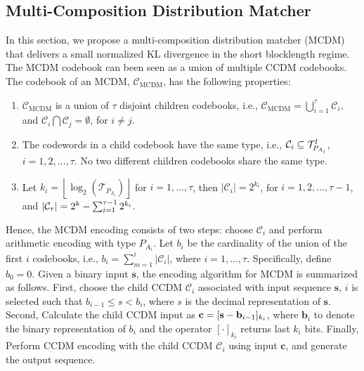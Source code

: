 \documentclass [PhD] {uclathes}
\begin{document}
\subsection{Multi-Composition Distribution Matcher }
In this section, we propose a multi-composition distribution matcher (MCDM) that delivers a small normalized KL divergence in the short blocklength regime. The MCDM codebook can been seen as a union of multiple CCDM codebooks. 
%
The codebook of an MCDM, $\mathcal{C}_{\mathrm{MCDM}}$, has the following properties: 
\begin{enumerate}
    \item $\mathcal{C}_{\mathrm{MCDM}}$ is a union of $\tau$ disjoint children codebooks, i.e., $\mathcal{C}_{\mathrm{MCDM}}=\bigcup_{i=1}^{\tau} \mathcal{C}_i,$ and $\mathcal{C}_i\bigcap \mathcal{C}_j = \emptyset$, for $i\neq j$.
     \item The codewords in a child codebook have the same type, i.e., $\mathcal{C}_{i}\subseteq \mathcal{T}^{l}_{P_{A_i}}$, $ i = 1,2,\ldots,\tau$. No two different children codebooks share the same type. 
    \item Let $k_i=\left\lfloor\log_2(\mathcal{T}_{P_{A_i}})\right\rfloor$ for $i=1,\ldots,\tau$, then $\left|\mathcal{C}_i\right|=2^{k_i}$, for $ i=1,2,\ldots,\tau-1$, and  $|\mathcal{C}_\tau|=2^k-\sum_{i=1}^{\tau-1}2^{k_i}$.
\end{enumerate}

Hence, the MCDM encoding consists of two steps: choose $\mathcal{C}_i$ and perform arithmetic encoding with type $P_{A_i}$.
Let $b_i$ be the cardinality of the union of the first $i$ codebooks, i.e., $b_i=\sum_{m=1}^{i}|\mathcal{C}_i|$, where $i=1,\ldots,\tau$. Specifically, define $b_0=0$. 
Given a binary input $\mathbf{s}$, the encoding algorithm for MCDM is  summarized as follows. First, choose the child CCDM $\mathcal{C}_i$ associated with input sequence $\mathbf{s}$, 
$i$ is selected such that ${b}_{i-1}\leq{s}<{b}_{i}$, where $s$ is the decimal representation of  $\mathbf{s}$. Second, Calculate the child CCDM input as $\mathbf{c} =  [\mathbf{s}-{\mathbf{b}_{i-1}}]_{k_i}$, where $\mathbf{b}_i$ to denote the binary representation of $b_i$ and the operator $[\cdot]_{k_i}$ returns last $k_i$ bits. Finally, Perform CCDM encoding with the child CCDM $\mathcal{C}_i$ using input $\mathbf{c}$, and generate the output sequence.
\end{document}
